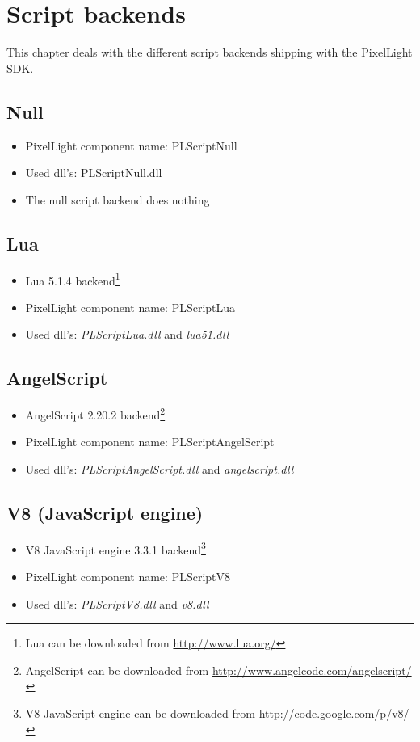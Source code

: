 \chapter{Script backends}
This chapter deals with the different script backends shipping with the PixelLight SDK.




\section{Null}
\begin{itemize}
\item PixelLight component name: PLScriptNull
\item Used dll's: PLScriptNull.dll
\item The null script backend does nothing
\end{itemize}




\section{Lua}
\begin{itemize}
\item Lua 5.1.4 backend\footnote{Lua can be downloaded from \url{http://www.lua.org/}}
\item PixelLight component name: PLScriptLua
\item Used dll's: \emph{PLScriptLua.dll} and \emph{lua51.dll}
\end{itemize}




\section{AngelScript}
\begin{itemize}
\item AngelScript 2.20.2 backend\footnote{AngelScript can be downloaded from \url{http://www.angelcode.com/angelscript/}}
\item PixelLight component name: PLScriptAngelScript
\item Used dll's: \emph{PLScriptAngelScript.dll} and \emph{angelscript.dll}
\end{itemize}




\section{V8 (JavaScript engine)}
\begin{itemize}
\item V8 JavaScript engine 3.3.1 backend\footnote{V8 JavaScript engine can be downloaded from \url{http://code.google.com/p/v8/}}
\item PixelLight component name: PLScriptV8
\item Used dll's: \emph{PLScriptV8.dll} and \emph{v8.dll}
\end{itemize}




